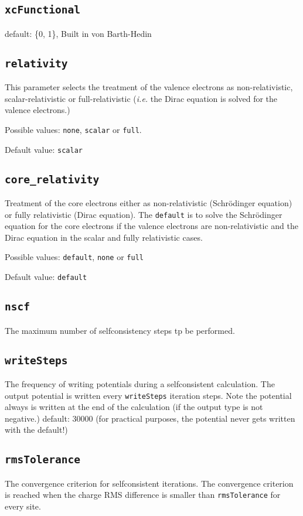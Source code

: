 \subsection{\texttt{xcFunctional}}
default: \{0, 1\}, Built in von Barth-Hedin

\subsection{\texttt{relativity}}
This parameter selects the treatment of the valence electrons as non-relativistic, scalar-relativistic
or full-relativistic (\textit{i.e.} the Dirac equation is solved for the valence electrons.)

Possible values: \texttt{none}, \texttt{scalar} or \texttt{full}.

Default value: \texttt{scalar} 

\subsection{\texttt{core\_relativity}}
Treatment of the core electrons either as non-relativistic (Schr\"odinger equation)
or fully relativistic (Dirac equation).
The \texttt{default} is to solve the Schr\"odinger equation for the core electrons if the valence
electrons are non-relativistic and the Dirac equation in the scalar and fully relativistic cases.
 
Possible values: \texttt{default}, \texttt{none} or \texttt{full}

Default value: \texttt{default}

\subsection{\texttt{nscf}}
The maximum number of selfconsistency steps tp be performed.

\subsection{\texttt{writeSteps}}
The frequency of writing potentials during a selfconsistent
calculation. The output potential is written every \texttt{writeSteps}
iteration steps. Note the potential always is written at the end of
the calculation (if the output type is not negative.)
default: 30000 (for practical purposes, the potential never gets
written with the default!)

\subsection{\texttt{rmsTolerance}}
The convergence criterion for selfconsistent iterations. The convergence criterion is reached when
the charge RMS difference is smaller than \texttt{rmsTolerance} for every site.

